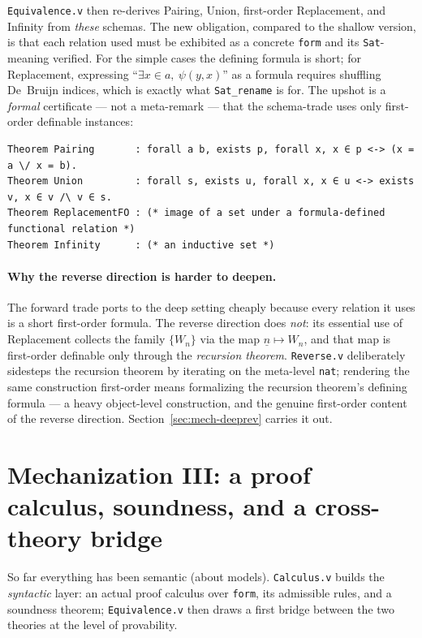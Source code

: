 \documentclass[11pt]{article}
\theoremstyle{plain}
\theoremstyle{definition}
\newcommand{\cq}[1]{\lstinline[basicstyle=\ttfamily]|#1|}
\begin{document}
\texttt{Equivalence.v} then re-derives Pairing, Union, first-order Replacement,
and Infinity from \emph{these} schemas. The new obligation, compared to the shallow
version, is that each relation used must be exhibited as a concrete \cq{form} and
its \cq{Sat}-meaning verified. For the simple cases the defining formula is short;
for Replacement, expressing ``$\exists x \in a,\ \psi(y,x)$'' as a formula requires
shuffling De~Bruijn indices, which is exactly what \cq{Sat_rename} is for. The
upshot is a \emph{formal} certificate --- not a meta-remark --- that the
schema-trade uses only first-order definable instances:

\begin{lstlisting}
Theorem Pairing       : forall a b, exists p, forall x, x ∈ p <-> (x = a \/ x = b).
Theorem Union         : forall s, exists u, forall x, x ∈ u <-> exists v, x ∈ v /\ v ∈ s.
Theorem ReplacementFO : (* image of a set under a formula-defined functional relation *)
Theorem Infinity      : (* an inductive set *)
\end{lstlisting}

\paragraph{Why the reverse direction is harder to deepen.} The forward trade ports
to the deep setting cheaply because every relation it uses is a short first-order
formula. The reverse direction does \emph{not}: its essential use of Replacement
collects the family $\{W_n\}$ via the map $\underline n \mapsto W_n$, and that map
is first-order definable only through the \emph{recursion theorem}.
\texttt{Reverse.v} deliberately sidesteps the recursion theorem by iterating on
the meta-level \cq{nat}; rendering the same construction first-order means
formalizing the recursion theorem's defining formula --- a heavy object-level
construction, and the genuine first-order content of the reverse direction.
Section~\ref{sec:mech-deeprev} carries it out.

\section{Mechanization III: a proof calculus, soundness, and a cross-theory bridge}\label{sec:mech-calculus}

So far everything has been semantic (about models). \texttt{Calculus.v} builds
the \emph{syntactic} layer: an actual proof calculus over \cq{form}, its
admissible rules, and a soundness theorem; \texttt{Equivalence.v} then draws a
first bridge between the two theories at the level of provability.
\end{document}
